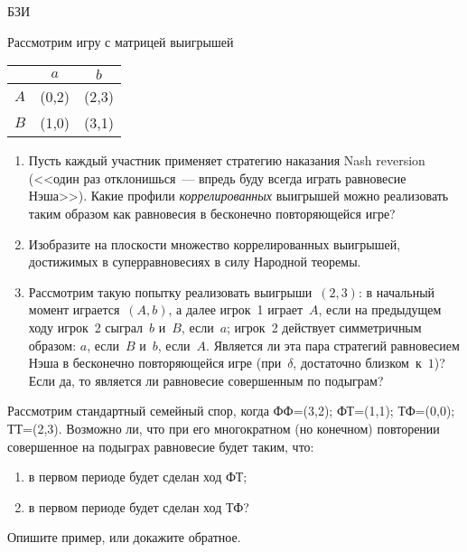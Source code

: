 \begin{problem}[Суперравновесия.]
\begin{source}
БЗИ
\end{source} Рассмотрим игру с матрицей выигрышей \begin{center}
\begin{tabular}{|c|cc|}
\hline &$a$&$b$\\ \hline $A$&(0,2)&(2,3)\\ $B$&(1,0)&(3,1)\\ \hline
\end{tabular}
\end{center}

\begin{enumerate}

\item Пусть каждый участник применяет стратегию наказания
Nash reversion (<<один раз отклонишься~--- впредь буду
всегда играть равновесие Нэша>>). Какие профили {\em
коррелированных} выигрышей можно реализовать таким образом
как равновесия в бесконечно повторяющейся игре?

\item Изобразите на плоскости множество коррелированных
выигрышей, достижимых в суперравновесиях в силу Народной
теоремы.

\item Рассмотрим такую попытку реализовать
выигрыши~$(2,3)$: в начальный момент играется~$(A,b)$, а
далее игрок~1 играет~$A$, если на предыдущем ходу игрок~2
сыграл~$b$ и~$B$, если~$a$; игрок~2 действует симметричным
образом: $a$, если~$B$ и~$b$, если~$A$. Является ли эта
пара стратегий равновесием Нэша в бесконечно повторяющейся
игре (при~$\delta$, достаточно близком~к~$1$)? Если да, то
является ли равновесие совершенным по подыграм?

\end{enumerate}

\begin{sol}

\end{sol}
\end{problem}




\begin{problem}
\begin{source}
\cite{savva:nmu}
\end{source}
Рассмотрим стандартный семейный спор, когда ФФ=(3,2); ФТ=(1,1); ТФ=(0,0); ТТ=(2,3). Возможно ли, что при его многократном (но конечном) повторении совершенное на подыграх равновесие будет таким, что:
\begin{enumerate}
\item в первом периоде будет сделан ход ФТ;
\item в первом периоде будет сделан ход ТФ?
\end{enumerate}
Опишите пример, или докажите обратное. 

\begin{sol}

\end{sol}
\end{problem}








